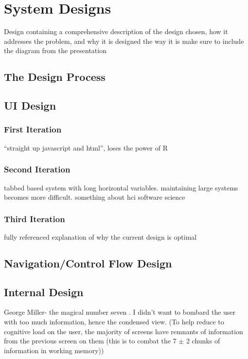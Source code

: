 \section{System Designs}
{\color{red} Design containing a comprehensive description of the design chosen, how it addresses the problem, and why it is designed the way it is}
{\color{red}  make sure to include the diagram from the presentation}

\subsection{The Design Process}
{\color{red}  }



\subsection{UI Design}
{\color{red}  }


	\subsubsection{First Iteration}
	{\color{red} ``straight up javascript and html'', loses the power of R }



	\subsubsection{Second Iteration}
	{\color{red} tabbed based system with long horizontal variables. maintaining large systems becomes more difficult. something about hci software science }


	\subsubsection{Third Iteration}		
	{\color{red} fully referenced explanation of why the current design is optimal }


\subsection{Navigation/Control Flow Design}		
{\color{red}  }


\subsection{Internal Design}
{\color{red}  }


{\color{red} 
George Miller- the magical number seven \cite{miller1956magical}.
I didn't want to bombard the user with too much information, hence the condensed view. (To help reduce to cognitive load on the user, the majority of screens have remnants of information from the previous screen on them (this is to combat the 7 $\pm$ 2 chunks of information in working memory))}